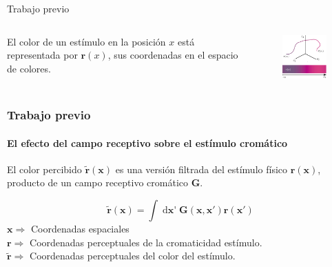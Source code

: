 \documentclass[
    11pt, %
    aspectratio=169, %
]{beamer}
\begin{document}
\begin{frame}{Trabajo previo}
 \begin{columns}[c] %

    
		\begin{column}{0.45\textwidth}
  
  El color de un estímulo en la posición $x$ está representada por $\mathbf{r}(x)$, sus coordenadas en el espacio de colores.\newline
          
 
               
		\end{column}
  		\begin{column}{0.55\textwidth} %
                 \begin{figure}[h!]
                    \centering
                    \includegraphics[angle=0, width=5.5cm]{Images/que_es_r_x.png}
                \end{figure}
		\end{column}		
	\end{columns}
\end{frame}






\begin{frame}
	\frametitle{Trabajo previo}
    \framesubtitle{El efecto del campo receptivo sobre el estímulo cromático}

    El color percibido $ \mathbf{\tilde{r}}(\mathbf{x})$ es una versión filtrada del estímulo físico $\mathbf{r}(\mathbf{x})$, producto de un campo receptivo cromático $\mathbf{G}$.

        
    \begin{equation*}
    \mathbf{\tilde{r}}(\mathbf{x}) = \displaystyle \int \mathop{d\mathbf{x}'}   \mathbf{G}(\mathbf{x},\mathbf{x}') \mathbf{r}(\mathbf{x}')
\end{equation*}
\small 
$\mathbf{x} \Rightarrow$  Coordenadas espaciales\\
$\mathbf{r} \Rightarrow$ Coordenadas perceptuales de la cromaticidad estímulo.\\
$\mathbf{\tilde{r}} \Rightarrow$ Coordenadas perceptuales del color del estímulo.
\normalsize


 

\end{frame}
\end{document}
